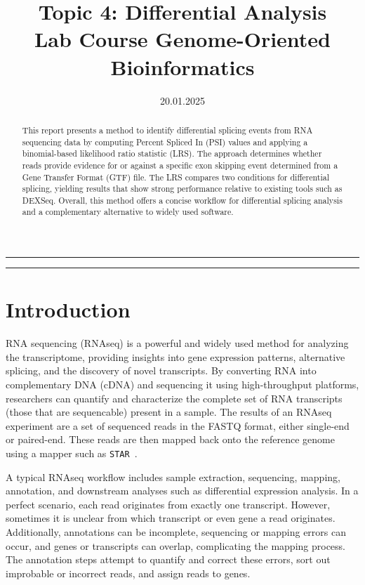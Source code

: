 \documentclass{article}
\title{Topic 4: Differential Analysis\\\large Lab Course Genome-Oriented Bioinformatics}
\author{}
\date{20.01.2025}
\begin{document}
    \maketitle
    \renewcommand{\abstractname}{}
    \begin{abstract}
        \large
        This report presents a method to identify differential splicing events from RNA sequencing data by computing Percent Spliced In (PSI) values and applying a binomial-based likelihood ratio statistic (LRS). The approach determines whether reads provide evidence for or against a specific exon skipping event determined from a Gene Transfer Format (GTF) file. The LRS compares two conditions for differential splicing, yielding results that show strong performance relative to existing tools such as DEXSeq. Overall, this method offers a concise workflow for differential splicing analysis and a complementary alternative to widely used software.
    \end{abstract}
    \hrule
    \tableofcontents
    \vspace{10pt} %
    \hrule

    \pagebreak


    \section{Introduction}\label{sec:introduction}
    RNA sequencing (RNAseq) is a powerful and widely used method for analyzing the transcriptome, providing insights into gene expression patterns, alternative splicing, and the discovery of novel transcripts. By converting RNA into complementary DNA (cDNA) and sequencing it using high-throughput platforms, researchers can quantify and characterize the complete set of RNA transcripts (those that are sequencable) present in a sample. The results of an RNAseq experiment are a set of sequenced reads in the FASTQ format, either single-end or paired-end. These reads are then mapped back onto the reference genome using a mapper such as \texttt{STAR}~\cite{star}.

    A typical RNAseq workflow includes sample extraction, sequencing, mapping, annotation, and downstream analyses such as differential expression analysis. In a perfect scenario, each read originates from exactly one transcript. However, sometimes it is unclear from which transcript or even gene a read originates. Additionally, annotations can be incomplete, sequencing or mapping errors can occur, and genes or transcripts can overlap, complicating the mapping process. The annotation steps attempt to quantify and correct these errors, sort out improbable or incorrect reads, and assign reads to genes.
\end{document}

